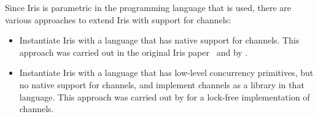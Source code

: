 \newcommand{\chanencfig}{
  \begin{figure}
    \begin{align*}
      \newchan \eqdef &
        \begin{array}[t]{l}
          \Let (l,r,\lockvar) = (\newlistt, \newlistt, \newlock) in \\
          ((l,r,\lockvar),(r,l,\lockvar))
        \end{array}\\
      \send{\chan}{\val} \eqdef &
        \begin{array}[t]{l}
          \Let (l,r,\lockvar) = \chan in\\
          \acquire{\lockvar};\\
          \quad \lsnoc\ l\ \val;\
          \skipn\ \listlength{r};\\
          \release{\lockvar}
        \end{array}\\
      \tryrecv{\chan} \eqdef &
        \begin{array}[t]{l}
          \Let (l,r,\lockvar) = \chan in\\
          \acquire{\lockvar};\\
          \quad \Let \mathit{ret} = (\If (\isnil\ r) then {(\none)} \Else (\some{(\pop\ l)}))
          in\\
          \release{\lockvar};\ \mathit{ret}\\
        \end{array}\\
      \recv{\chan} \eqdef & \
          \MatchML (\tryrecv{\chan}) with
          \none => \recv{\chan}
          | \some{\val} => \val
          end \
    \end{align*}
  \caption{Implementation of bidirectional channels in HeapLang.}
  \label{fig:channel_implementation}
\end{figure}
}

Since Iris is parametric in the programming language that is used, there are
various approaches to extend Iris with support for channels:

\begin{itemize}
\item Instantiate Iris with a language that has native support
  for channels.
  This approach was carried out in the original Iris paper~\cite{jung-POPL2015} and by
  \citet{tassarotti-ESOP2017}.
\item Instantiate Iris with a language that has low-level concurrency
  primitives, but no native support for channels, and implement channels as a
  library in that language.
  This approach was carried out by \citet{bizjak-PACMPL2019} for a lock-free
  implementation of channels.
\end{itemize}


